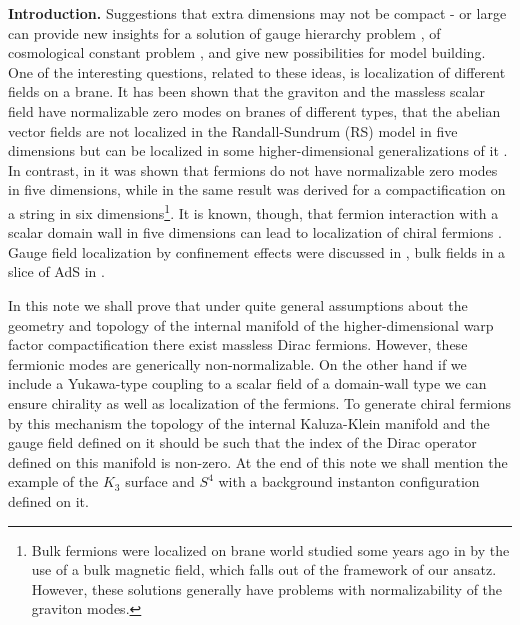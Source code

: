 \documentclass[a4paper,12pt]{article}
\begin{document}
{\bf Introduction.} Suggestions that extra dimensions may not be
compact \cite{RS1}-\cite{rusu} or large \cite{ant,ant1} can provide
new insights for a solution of gauge hierarchy problem \cite{ant1},
of cosmological constant problem \cite{RS2,seif}, and give new
possibilities  for model building. One of the interesting questions,
related to these ideas, is localization of different fields on a
brane. It has been shown that the graviton \cite{rusu} and the
massless scalar field \cite{baj} have normalizable zero modes on
branes of different types, that the abelian vector fields are not
localized in the Randall-Sundrum (RS) model in five dimensions but
can be localized in some higher-dimensional generalizations of it
\cite{oda}. In contrast, in \cite{baj} it was shown that fermions do
not have normalizable zero modes in five dimensions, while in
\cite{oda} the same result was derived for a compactification on a
string \cite{gs,rg} in six dimensions\footnote{Bulk fermions were
localized on brane world studied some years ago in \cite{GW} by the
use of a bulk magnetic field, which falls out of the framework of our
ansatz. However, these solutions generally have problems with
normalizability of the graviton modes.}. It is known, though, that
fermion interaction with a scalar domain wall in five dimensions can
lead to localization of chiral fermions \cite{RS1}. Gauge field
localization by confinement effects were discussed in
\cite{Dvali:1997xe}, bulk fields in a slice of AdS in
\cite{Gherghetta:2000qt}.

In this note we shall prove that under quite general assumptions 
about the geometry and topology of the internal manifold of the
higher-dimensional warp factor compactification there exist massless
Dirac fermions. However, these fermionic modes are generically
non-normalizable. On the other hand if we include a Yukawa-type
coupling to a scalar field of a domain-wall type we can ensure
chirality as well as localization of the fermions. To generate chiral
fermions by this mechanism the topology of the internal Kaluza-Klein
manifold and the gauge field defined on it should be such that the
index of the Dirac operator defined on this manifold is non-zero. At
the end of this note we shall mention the example of the $K_3$
surface and $S^4$ with a background instanton configuration defined
on it.
\end{document}
